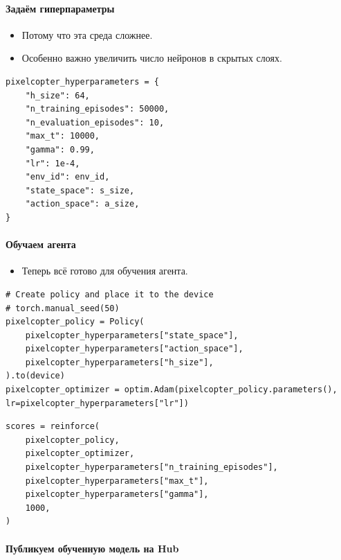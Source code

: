 \documentclass[11pt,a4paper]{article}
\begin{document}
\paragraph{Задаём гиперпараметры}\label{define-the-hyperparameters}

\begin{itemize}
\tightlist
\item
  Потому что эта среда сложнее.
\item
  Особенно важно увеличить число нейронов в скрытых слоях.
\end{itemize}

\begin{lstlisting}
pixelcopter_hyperparameters = {
    "h_size": 64,
    "n_training_episodes": 50000,
    "n_evaluation_episodes": 10,
    "max_t": 10000,
    "gamma": 0.99,
    "lr": 1e-4,
    "env_id": env_id,
    "state_space": s_size,
    "action_space": a_size,
}
\end{lstlisting}

\paragraph{Обучаем агента}\label{train-it-1}

\begin{itemize}
\tightlist
\item
  Теперь всё готово для обучения агента.
\end{itemize}

\begin{lstlisting}
# Create policy and place it to the device
# torch.manual_seed(50)
pixelcopter_policy = Policy(
    pixelcopter_hyperparameters["state_space"],
    pixelcopter_hyperparameters["action_space"],
    pixelcopter_hyperparameters["h_size"],
).to(device)
pixelcopter_optimizer = optim.Adam(pixelcopter_policy.parameters(), lr=pixelcopter_hyperparameters["lr"])
\end{lstlisting}

\begin{lstlisting}
scores = reinforce(
    pixelcopter_policy,
    pixelcopter_optimizer,
    pixelcopter_hyperparameters["n_training_episodes"],
    pixelcopter_hyperparameters["max_t"],
    pixelcopter_hyperparameters["gamma"],
    1000,
)
\end{lstlisting}

\paragraph{Публикуем обученную модель на Hub}\label{publish-our-trained-model-on-the-hub-1}
\end{document}
